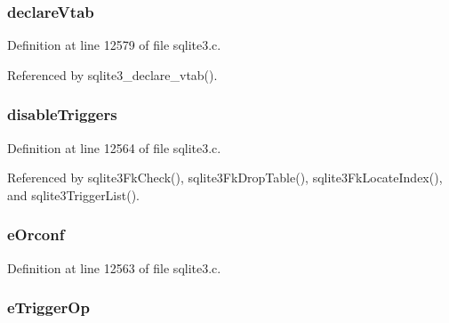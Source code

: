 \hypertarget{struct_parse_ac0510fd1157fb5ff185aa29a41c13e80}{}
\subsubsection[{declare\+Vtab}]{ declare\+Vtab}\label{struct_parse_ac0510fd1157fb5ff185aa29a41c13e80}


Definition at line 12579 of file sqlite3.\+c.



Referenced by sqlite3\+\_\+declare\+\_\+vtab().

\hypertarget{struct_parse_ae3495fc2dbc5996dd427e9244b1cf8e6}{}
\subsubsection[{disable\+Triggers}]{ disable\+Triggers}\label{struct_parse_ae3495fc2dbc5996dd427e9244b1cf8e6}


Definition at line 12564 of file sqlite3.\+c.



Referenced by sqlite3\+Fk\+Check(), sqlite3\+Fk\+Drop\+Table(), sqlite3\+Fk\+Locate\+Index(), and sqlite3\+Trigger\+List().

\hypertarget{struct_parse_a08f37932fed75dc4be553b8db2378db5}{}
\subsubsection[{e\+Orconf}]{ e\+Orconf}\label{struct_parse_a08f37932fed75dc4be553b8db2378db5}


Definition at line 12563 of file sqlite3.\+c.

\hypertarget{struct_parse_a9c29be1e83ed4451bfec886577d22b5b}{}
\subsubsection[{e\+Trigger\+Op}]{ e\+Trigger\+Op}\label{struct_parse_a9c29be1e83ed4451bfec886577d22b5b}



